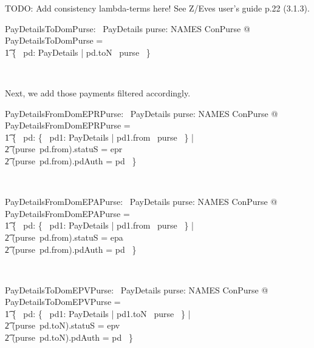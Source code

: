 TODO: Add consistency lambda-terms here! See Z/Eves user's guide p.22 (3.1.3).
\begin{LNewADef}
\begin{axdef}
   PayDetailsToDomPurse: \power~PayDetails
\where
    \forall purse: NAMES \finj ConPurse @ PayDetailsToDomPurse = \\
    \t1 \{~ pd: PayDetails | pd.toN \in \dom~purse ~\}
\end{axdef}~\end{LNewADef}
%
Next, we add those payments filtered accordingly.
%
\begin{LNewADef}
\begin{axdef}
   PayDetailsFromDomEPRPurse: \power~PayDetails
\where
    \forall purse: NAMES \finj ConPurse @ PayDetailsFromDomEPRPurse = \\
    \t1 \{~ pd: \{~ pd1: PayDetails | pd1.from \in \dom~purse ~\} | \\
        \t2 (purse~pd.from).statuS = epr \\
        \t2 \land (purse~pd.from).pdAuth = pd ~\}
\end{axdef}~\end{LNewADef}
%
\begin{LNewADef}
\begin{axdef}
   PayDetailsFromDomEPAPurse: \power~PayDetails
\where
    \forall purse: NAMES \finj ConPurse @ PayDetailsFromDomEPAPurse = \\
    \t1 \{~ pd: \{~ pd1: PayDetails | pd1.from \in \dom~purse ~\} | \\
        \t2 (purse~pd.from).statuS = epa \\
        \t2 \land (purse~pd.from).pdAuth = pd ~\}
\end{axdef}~\end{LNewADef}
%
\begin{LNewADef}
\begin{axdef}
   PayDetailsToDomEPVPurse: \power~PayDetails
\where
    \forall purse: NAMES \finj ConPurse @ PayDetailsToDomEPVPurse = \\
    \t1 \{~ pd: \{~ pd1: PayDetails | pd1.toN \in \dom~purse ~\} | \\
        \t2 (purse~pd.toN).statuS = epv \land \\
        \t2 (purse~pd.toN).pdAuth = pd ~\}
\end{axdef}~\end{LNewADef}
